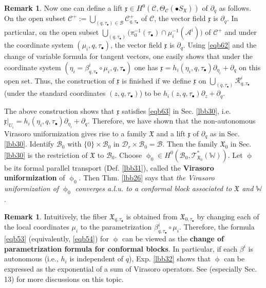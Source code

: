 \documentclass[11pt,b5paper,notitlepage]{article}
\theoremstyle{definition}
\newtheorem{rem}[df]{Remark}
\theoremstyle{plain}
\newcommand{\fk}{\mathfrak}
\newcommand{\mc}{\mathcal}
\newcommand{\scr}{\mathscr}
\newcommand{\xk}{\mathfrak x}
\newcommand{\SX}{{S_{\fk X}}}
\newcommand{\blt}{\bullet}
\newcommand{\Wbb}{\mathbb W}
\newcommand{\<}{\left\langle}
\renewcommand{\>}{\right\rangle}
\newcommand{\MC}{\mathcal{C}}
\newcommand{\MB}{\mathcal{B}}
\newcommand{\fx}{\mathfrak{X}}
\newcommand{\dps}{\displaystyle}
\numberwithin{equation}{section}
\begin{document}
\begin{rem}
Now one can define a lift $\xk\in H^0(\MC,\Theta_\MC(\blt\SX))$ of $\partial_q$ as follows. On the open subset $\dps\MC^+:=\bigcup_{(q,\tau_\blt)\in\MB}\MC^+_{q,\tau_\blt}$ of $\MC$, the vector field $\xk$ is $\partial_q$. In particular, on the open subset $\dps\bigcup_{(q,\tau_\blt)}\big(\pi^{-1}_0(\tau_\blt)\cap\mu_i^{-1}(\mc A^i)\big)$ of $\MC^+$ and under the coordinate system $(\mu_i,q,\tau_\blt)$, the vector field $\xk$ is $\partial_q$. Using \eqref{eqb62} and the change of variable formula for tangent vectors, one easily shows that under the coordinate system $(\eta_i=\beta^i_{q,\tau_\blt}\circ\mu_i,q,\tau_\blt)$ one has $\xk=h_i(\eta_i,q,\tau_\blt)\partial_{\eta_i}+\partial_q$ on this open set. Thus, the construction of $\xk$ is finished if we define $\xk$ on $\dps\bigcup_{(q,\tau_\blt)}\mc R^i_{q,\tau_\blt}$ (under the standard coordinates $(z,q,\tau_\blt)$) to be $h_i(z,q,\tau_\blt)\partial_z+\partial_q$.
\end{rem}

The above construction shows that $\xk$ satisfies \eqref{eqb63} in Sec. \ref{lbb30}, i.e. $\xk|_{U_i}=h_i(\eta_i,q,\tau_\blt)\partial_{\eta_i}+\partial_q$. Therefore, we have shown that the non-autonomous Virasoro uniformization gives rise to a family $\fk X$ and a lift $\xk$ of $\partial_q$ as in Sec. \ref{lbb30}. Identify $\MB_0$ with $\{0\}\times\MB_0$ in $\mc D_r\times\MB_0=\MB$. Then the family $\fx_0$ in Sec. \ref{lbb30} is the restriction of $\fx$ to $\MB_0$. Choose $\upphi_0\in H^0(\MB_0,\scr T_{\fx_0}^*(\Wbb))$. Let $\upphi$ be its formal parallel transport (Def. \ref{lbb31}), called the \textbf{Virasoro uniformization} of $\upphi_0$. Then Thm. \ref{lbb26} says that \textit{the Virasoro uniformization of $\upphi_0$ converges a.l.u. to a conformal block associated to $\fx$ and $\Wbb$}. 

\begin{rem}
Intuitively, the fiber $\fx_{q,\tau_\blt}$ is obtained from $\fx_{0,\tau_\blt}$ by changing each of the local coordinates $\mu_i$ to the parametrization $\beta^i_{q,\tau_\blt}\circ\mu_i$. Therefore, the formula \eqref{eqb53} (equivalently, \eqref{eqb54}) for $\upphi$ can be viewed as the \textbf{change of parametrization formula for conformal blocks}. In particular, if each $\beta^i$ is autonomous (i.e., $h_i$ is independent of $q$), Exp. \ref{lbb32} shows that $\upphi$ can be expressed as the exponential of a sum of Virasoro operators. See \cite{GuiLec} (especially Sec. 13) for more discussions on this topic.
\end{rem}
\end{document}
